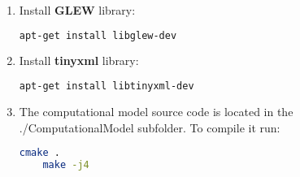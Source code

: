 \documentclass{article}
\begin{document}
\begin{enumerate}
  \item Install \textbf{GLEW} library:
    \begin{lstlisting}[language=bash]
    apt-get install libglew-dev
    \end{lstlisting}
    

  \item Install \textbf{tinyxml} library:
    \begin{lstlisting}[language=bash]
    apt-get install libtinyxml-dev
    \end{lstlisting}
    
  \item The computational model source code is located in the ./ComputationalModel subfolder. To compile it run:
    \begin{lstlisting}[language=bash]
    cmake .
    make -j4
    \end{lstlisting}
\end{enumerate}
\end{document}
